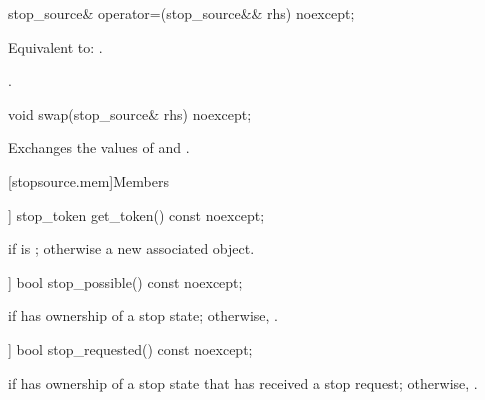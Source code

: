 %
\begin{itemdecl}
stop_source& operator=(stop_source&& rhs) noexcept;
\end{itemdecl}

\begin{itemdescr}
\pnum
\effects
Equivalent to: .

\pnum
\returns
{}.
\end{itemdescr}

%
\begin{itemdecl}
void swap(stop_source& rhs) noexcept;
\end{itemdecl}

\begin{itemdescr}
\pnum
\effects
Exchanges the values of  and .
\end{itemdescr}

[stopsource.mem]{Members}

%
\begin{itemdecl}
[[nodiscard]] stop_token get_token() const noexcept;
\end{itemdecl}

\begin{itemdescr}
\pnum
\returns
{} if  is ;
otherwise a new associated  object.
\end{itemdescr}

%
\begin{itemdecl}
[[nodiscard]] bool stop_possible() const noexcept;
\end{itemdecl}

\begin{itemdescr}
\pnum
\returns
{} if  has ownership of a stop state;
otherwise, .
\end{itemdescr}

%
\begin{itemdecl}
[[nodiscard]] bool stop_requested() const noexcept;
\end{itemdecl}

\begin{itemdescr}
\pnum
\returns
{} if  has ownership of a stop state
that has received a stop request;
otherwise, .
\end{itemdescr}

